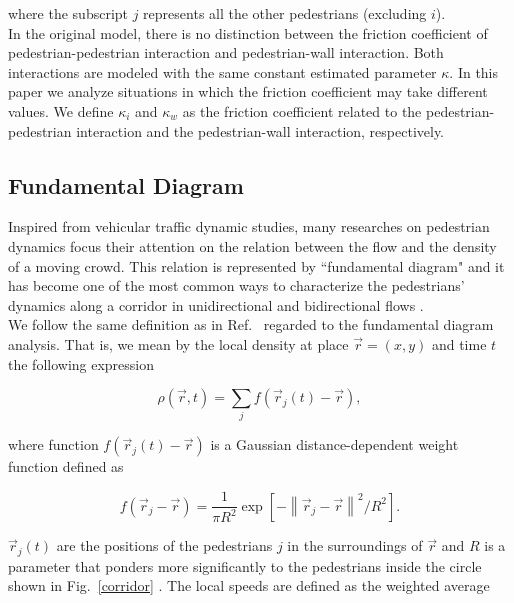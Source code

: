 \documentclass[preprint,12pt]{elsarticle}
\begin{document}
where the subscript $j$ represents all the other pedestrians 
(excluding $i$).\\

In the original model, there is no distinction between the friction coefficient of pedestrian-pedestrian interaction and pedestrian-wall interaction. Both interactions are modeled with the same constant estimated parameter $\kappa$. In this paper we analyze situations in which the friction coefficient may take different values. We define $\kappa_i$ and $\kappa_w$ as the friction coefficient related to the pedestrian-pedestrian interaction and the pedestrian-wall interaction, respectively. 

\subsection{\label{fundamental-diagram} Fundamental Diagram}

Inspired from vehicular traffic dynamic studies, many researches on pedestrian dynamics focus their attention on the relation between the flow and the density of a moving crowd. This relation is represented by ``fundamental diagram" and it has become one of the most common ways to characterize the pedestrians' dynamics along a corridor in unidirectional and bidirectional flows \cite{fruin1,mori1,polus1,seyfried1,jelic1}. \\

We follow the same definition as in Ref.~\cite{helbing3} regarded to the fundamental diagram analysis. That is, we mean by the local density at place $\vec{r}=(x,y)$ and time $t$ the following expression

\begin{equation}
\rho(\vec{r},t)=\sum_{j}f(\vec{r}_j(t)-\vec{r}), \label{ec-density}
\end{equation}

where function $f(\vec{r}_j(t)-\vec{r})$ is a Gaussian distance-dependent weight function defined as

\begin{equation}
f(\vec{r}_j-\vec{r})=\frac{1}{\pi R^2}\exp[-\left \| \vec{r}_j-\vec{r} \right \|^2/R^2]. \label{ec-f}
\end{equation}

$\vec{r}_j(t)$ are the positions of the pedestrians $j$ in the surroundings of $\vec{r}$ and $R$ is a parameter that ponders more significantly to the pedestrians inside the circle shown in Fig.~\ref{corridor} . 
The local speeds are defined as the weighted average  
\end{document}
